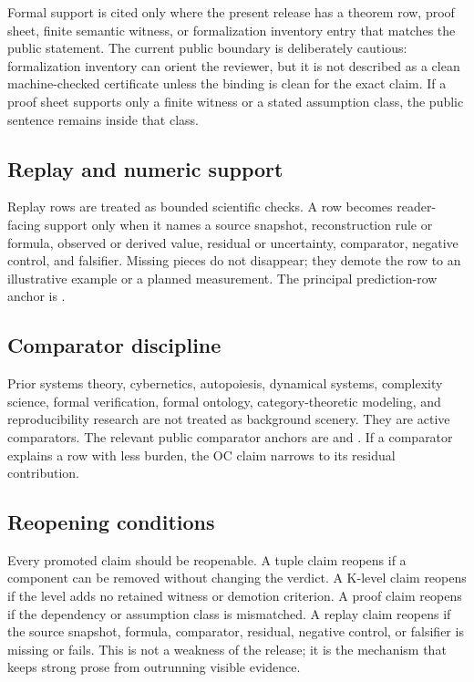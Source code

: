 Formal support is cited only where the present release has a theorem row, proof
sheet, finite semantic witness, or formalization inventory entry that matches
the public statement. The current public boundary is deliberately cautious:
formalization inventory can orient the reviewer, but it is not described as a
clean machine-checked certificate unless the binding is clean for the exact
claim. If a proof sheet supports only a finite witness or a stated assumption
class, the public sentence remains inside that class.

\subsection{Replay and numeric support}

Replay rows are treated as bounded scientific checks. A row becomes
reader-facing support only when it names a source snapshot, reconstruction rule
or formula, observed or derived value, residual or uncertainty, comparator,
negative control, and falsifier. Missing pieces do not disappear; they demote
the row to an illustrative example or a planned measurement. The principal
prediction-row anchor is
.

\subsection{Comparator discipline}

Prior systems theory, cybernetics, autopoiesis, dynamical systems, complexity
science, formal verification, formal ontology, category-theoretic modeling, and
reproducibility research are not treated as background scenery. They are active
comparators. The relevant public comparator anchors are
 and
. If a comparator explains a
row with less burden, the OC claim narrows to its residual contribution.

\subsection{Reopening conditions}

Every promoted claim should be reopenable. A tuple claim reopens if a component
can be removed without changing the verdict. A K-level claim reopens if the
level adds no retained witness or demotion criterion. A proof claim reopens if
the dependency or assumption class is mismatched. A replay claim reopens if the
source snapshot, formula, comparator, residual, negative control, or falsifier
is missing or fails. This is not a weakness of the release; it is the mechanism
that keeps strong prose from outrunning visible evidence.

